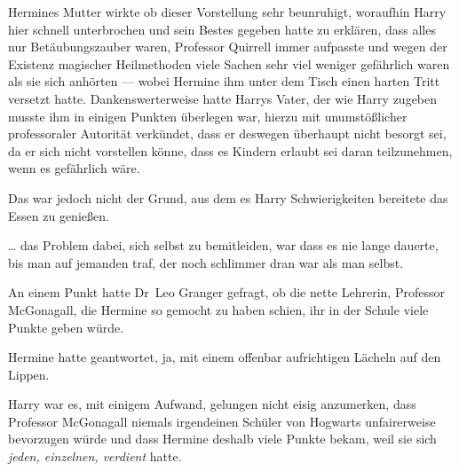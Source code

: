 Hermines Mutter wirkte ob dieser Vorstellung sehr beunruhigt, woraufhin Harry hier schnell unterbrochen und sein Bestes gegeben hatte zu erklären, dass alles nur Betäubungszauber waren, Professor Quirrell immer aufpasste und wegen der Existenz magischer Heilmethoden viele Sachen sehr viel weniger gefährlich waren als sie sich anhörten — wobei Hermine ihm unter dem Tisch einen harten Tritt versetzt hatte. Dankenswerterweise hatte Harrys Vater, der wie Harry zugeben musste ihm in einigen Punkten überlegen war, hierzu mit unumstößlicher professoraler Autorität verkündet, dass er deswegen überhaupt nicht besorgt sei, da er sich nicht vorstellen könne, dass es Kindern erlaubt sei daran teilzunehmen, wenn es gefährlich wäre.

Das war jedoch nicht der Grund, aus dem es Harry Schwierigkeiten bereitete das Essen zu genießen.

… das Problem dabei, sich selbst zu bemitleiden, war dass es nie lange dauerte, bis man auf jemanden traf, der noch schlimmer dran war als man selbst.

An einem Punkt hatte Dr~Leo Granger gefragt, ob die nette Lehrerin, Professor McGonagall, die Hermine so gemocht zu haben schien, ihr in der Schule viele Punkte geben würde.

Hermine hatte geantwortet, ja, mit einem offenbar aufrichtigen Lächeln auf den Lippen.

Harry war es, mit einigem Aufwand, gelungen nicht eisig anzumerken, dass Professor McGonagall niemals irgendeinen Schüler von Hogwarts unfairerweise bevorzugen würde und dass Hermine deshalb viele Punkte bekam, weil sie sich \emph{jeden, einzelnen, verdient} hatte.

